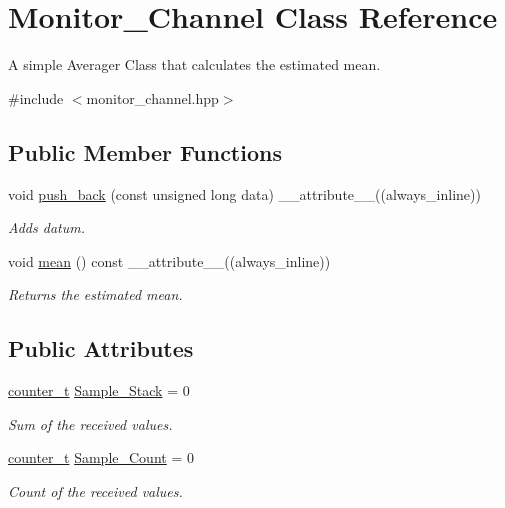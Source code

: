 \hypertarget{classMonitor__Channel}{}\section{Monitor\+\_\+\+Channel Class Reference}
\label{classMonitor__Channel}


A simple Averager Class that calculates the estimated mean.  




{\ttfamily \#include $<$monitor\+\_\+channel.\+hpp$>$}

\subsection*{Public Member Functions}
\begin{DoxyCompactItemize}
\item 
void \hyperlink{classMonitor__Channel_a4ed59419438e461cca7b211337840b0f}{push\+\_\+back} (const unsigned long data) \+\_\+\+\_\+attribute\+\_\+\+\_\+((always\+\_\+inline))
\begin{DoxyCompactList}\small\item\em Adds datum. \end{DoxyCompactList}\item 
void \hyperlink{classMonitor__Channel_af36bc5cdbc25444ae5941241d0edb6b0}{mean} () const \+\_\+\+\_\+attribute\+\_\+\+\_\+((always\+\_\+inline))
\begin{DoxyCompactList}\small\item\em Returns the estimated mean. \end{DoxyCompactList}\end{DoxyCompactItemize}
\subsection*{Public Attributes}
\begin{DoxyCompactItemize}
\item 
\hyperlink{types_8hpp_a22f279793847eba127de149437848c48}{counter\+\_\+t} \hyperlink{classMonitor__Channel_a5523d9f38c2910b4014e93d18a9267cd}{Sample\+\_\+\+Stack} = 0
\begin{DoxyCompactList}\small\item\em Sum of the received values. \end{DoxyCompactList}\item 
\hyperlink{types_8hpp_a22f279793847eba127de149437848c48}{counter\+\_\+t} \hyperlink{classMonitor__Channel_a20d148ca870b96cb19b7befbb0b2cd2b}{Sample\+\_\+\+Count} = 0
\begin{DoxyCompactList}\small\item\em Count of the received values. \end{DoxyCompactList}\end{DoxyCompactItemize}


